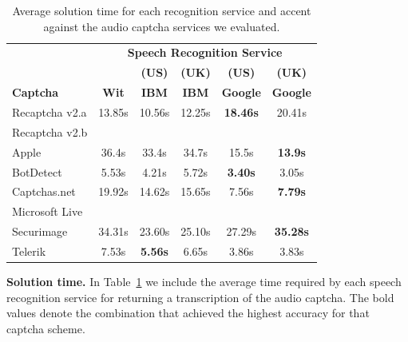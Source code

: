 \begin{table}[t]
\centering
\caption{Average solution time for each recognition service and accent against the audio captcha services we evaluated.}
\begin{tabular}{lccccc}
\toprule
&\multicolumn{5}{c}{\textbf{Speech Recognition Service}}\\
\cmidrule{2-6}
& & \textbf{(US)} & \textbf{(UK)} & \textbf{(US)} & \textbf{(UK)} \\
\textbf{Captcha}&  \textbf{Wit} & \textbf{IBM} & \textbf{IBM} & \textbf{Google} & \textbf{Google} \\
\hline
Recaptcha v2.a & 13.85s & 10.56s  & 12.25s & \textbf{18.46s} & 20.41s \\
\rowcolor{Gray}
Recaptcha v2.b &  &  &  & & \\
Apple  & 36.4s & 33.4s  & 34.7s & 15.5s & \textbf{13.9s} \\
\rowcolor{Gray}
BotDetect  & 5.53s  & 4.21s & 5.72s & \textbf{3.40s} & 3.05s \\
Captchas.net  & 19.92s  & 14.62s  & 15.65s  & 7.56s & \textbf{7.79s} \\
\rowcolor{Gray}
Microsoft Live & &  &  & & \\
Securimage  & 34.31s & 23.60s & 25.10s  & 27.29s & \textbf{35.28s} \\
\rowcolor{Gray}
Telerik  & 7.53s & \textbf{5.56s} & 6.65s & 3.86s & 3.83s \\
\bottomrule
\end{tabular}
\label{tab:solution_time}
\end{table}

\textbf{Solution time.} In Table~\ref{tab:solution_time} we include the average time required by each speech recognition 
service for returning a transcription of the audio captcha. The bold values denote the combination that achieved the highest 
accuracy for that captcha scheme.


